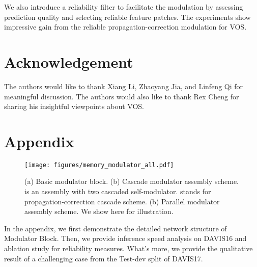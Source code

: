 \documentclass[letterpaper]{article} \usepackage{aaai22}  \usepackage{times}  \usepackage{helvet}  \usepackage{courier}  \usepackage[hyphens]{url}  \usepackage{graphicx} \urlstyle{rm} \def\UrlFont{\rm}  \usepackage{natbib}  \usepackage{caption} \DeclareCaptionStyle{ruled}{labelfont=normalfont,labelsep=colon,strut=off} \frenchspacing  \setlength{\pdfpagewidth}{8.5in}  \setlength{\pdfpageheight}{11in}  \usepackage{algorithm}
\begin{document}
We also introduce a reliability filter to facilitate the modulation by assessing prediction quality and selecting reliable feature patches. 
The experiments show impressive gain from the reliable propagation-correction modulation for VOS.
 
\section{Acknowledgement}
\label{sec:Acknowledgement}
The authors would like to thank Xiang Li, Zhaoyang Jia, and Linfeng Qi for meaningful discussion. The authors would also like to thank Rex Cheng for sharing his insightful viewpoints about VOS.  
%
 
\clearpage

\setcounter{table}{0}  
\setcounter{figure}{0}  
\renewcommand{\thetable}{\Alph{table}}
\renewcommand{\thefigure}{\Alph{figure}}

\section{Appendix}\label{appendix}
\begin{figure*}[t]
	\centering
	\texttt{[image: figures/memory\_modulator\_all.pdf]}
\caption{(a) Basic modulator block. (b) Cascade modulator assembly scheme.  is an assembly with two cascaded self-modulator.  stands for propagation-correction cascade scheme. (b) Parallel modulator assembly scheme. We show  here for illustration.} 
	\label{fig:mem_modu_all}
\end{figure*} 
In the appendix, we first demonstrate the detailed network structure of Modulator Block. Then, we provide inference speed analysis on DAVIS16 and ablation study for reliability measures. What's more, we provide the qualitative result of a challenging case from the Test-dev split of DAVIS17.
\end{document}
